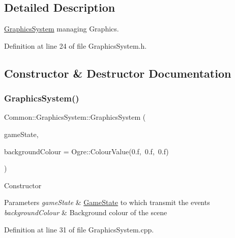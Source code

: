 \subsection{Detailed Description}
\hyperlink{class_common_1_1_graphics_system}{Graphics\+System} managing Graphics. 

Definition at line 24 of file Graphics\+System.\+h.



\subsection{Constructor \& Destructor Documentation}
\mbox{\label{class_common_1_1_graphics_system_a640e8520e276805c15f12d340a7b6090}} 
\subsubsection{\texorpdfstring{Graphics\+System()}{GraphicsSystem()}}
{\footnotesize\ttfamily Common\+::\+Graphics\+System\+::\+Graphics\+System (\begin{DoxyParamCaption}\item[{\hyperlink{class_common_1_1_game_state}{Game\+State} $\ast$}]{game\+State,  }\item[{Ogre\+::\+Colour\+Value}]{background\+Colour = {\ttfamily Ogre\+:\+:ColourValue(0.f,~0.f,~0.f)} }\end{DoxyParamCaption})}

Constructor 
\begin{DoxyParams}{Parameters}
{\em game\+State} & \hyperlink{class_common_1_1_game_state}{Game\+State} to which transmit the events \\
\hline
{\em background\+Colour} & Background colour of the scene \\
\hline
\end{DoxyParams}


Definition at line 31 of file Graphics\+System.\+cpp.

\mbox{\label{class_common_1_1_graphics_system_ad866bbb65f4043da5e6cab82d3eeb551}} 
